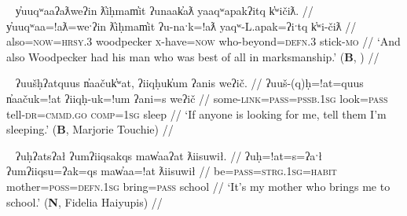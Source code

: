 \begin{comment}
\ex \label{ex:doubleatl2}
\begingl
\glpreamble ʔuḥʔaƛ tiic̓̌ap̓aƛ hałmiiḥa. //
\gla ʔuḥ=!aƛ tiic=!ap=!aƛ hałmiiḥa  //
\glb be=\textsc{now} alive.\textsc{dr}=\textsc{caus}=\textsc{now} drown.\textsc{ct} //
\glft `He made him alive from drowning.' (\textbf{C}, \textit{tupaat} Julia Lucas) //
\endgl
\xe
\end{comment}

\ex~ \label{ex:doubleatlyuuqwaa}
\begingl
\glpreamble y̓uuqʷaaʔaƛweʔin ƛ̓iḥmam̓it ʔunaak̓aƛ yaaqʷapakʔitq k̓ʷičiƛ. //
\gla y̓uuqʷaa=!aƛ=weˑʔin ƛ̓iḥmam̓it ʔu-naˑk=!aƛ yaqʷ-L.apak=ʔiˑtq k̓ʷi-čiƛ  //
\glb also=\textsc{now}=\textsc{hrsy.3} woodpecker \textsc{x}-have=\textsc{now} who-beyond=\textsc{defn.3} stick-\textsc{mo} //
\glft `And also Woodpecker had his man who was best of all in marksmanship.' (\textbf{B}, \citealt[50]{sapir1939}) //
\endgl
\xe


\begin{comment}
\ex~ \label{ex:doubleap}
\begingl
\glpreamble hišuk̓ap̓aƛ witkʷaaʔap ʔin wikmaḥsap̓aƛ, ḥaakʷaaƛsma. //
\gla hišuk=!ap=!aƛ witkʷaa=!ap ʔin wik-maḥsa=!ap=!aƛ, ḥaakʷaaƛ-sma  //
\glb all=\textsc{caus}=\textsc{now} destroy=\textsc{caus} \textsc{comp} \textsc{neg}-want.to=\textsc{caus}=\textsc{caus} young.woman-protective.of //
\glft `Everyone destroyed the wharf because they wanted her to marry, they were stingy of the girl.' (\textbf{C}, \textit{tupaat} Julia Lucas) //
\endgl
\xe
\end{comment}


\ex~ \label{ex:doubleatuush}
\begingl
\glpreamble ʔuušḥʔatquus n̓aačuk̓ʷat, ʔiiqḥuk̓um ʔanis weʔič. //
\gla ʔuuš-(q)ḥ=!at=quus n̓aačuk=!at ʔiiqḥ-uk=!um ʔani=s weʔič  //
\glb some-\textsc{link}=\textsc{pass}=\textsc{pssb.1sg} look=\textsc{pass} tell-\textsc{dr}=\textsc{cmmd.go} \textsc{comp}=\textsc{1sg} sleep //
\glft `If anyone is looking for me, tell them I'm sleeping.' (\textbf{B}, Marjorie Touchie) //
\endgl
\xe

\ex~ \label{ex:doubleatuh}
\begingl
\glpreamble ʔuḥʔatsʔał ʔumʔiiqsakqs maw̓aaʔat ƛiisuwił. //
\gla ʔuḥ=!at=s=ʔaˑł ʔumʔiiqsu=ʔak=qs maw̓aa=!at ƛiisuwił  //
\glb be=\textsc{pass}=\textsc{strg.1sg}=\textsc{habit} mother=\textsc{poss}=\textsc{defn.1sg} bring=\textsc{pass} school //
\glft `It's my mother who brings me to school.' (\textbf{N}, Fidelia Haiyupis) //
\endgl
\xe

